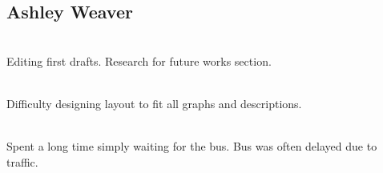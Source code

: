 \documentclass[11pt,journal,compsoc]{IEEEtran} %
\newcommand{\ditem}[2]{\item[#1] \hfill \\ #2}
\begin{document}
\subsection*{Ashley Weaver}
\begin{description}{}
\ditem{Cowrote report}{
	Editing first drafts.
	Research for future works section.
}
\ditem{Cowrote Poster}{
	Difficulty designing layout to fit all graphs and descriptions.
}
\ditem{Collected bus data}{
	Spent a long time simply waiting for the bus.
	Bus was often delayed due to traffic.
}
\end{description}
\end{document}
